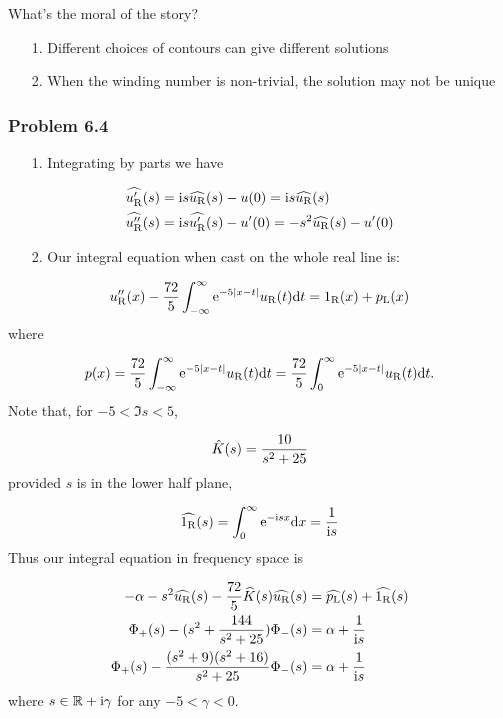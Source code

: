 \documentclass[12pt,landscape]{article}
\def\D{ {\rm d} }
\def\I{ {\rm i} }
\def\E{ {\rm e} }
\def\R{ {\mathbb R} }
\def\dx{\D x}
\def\dt{\D t}
\def\rR{ {\rm R} }
\def\rL{ {\rm L} }
\begin{document}
{What's the moral of the story?

\begin{itemize}
\item[1. ] Different choices of contours can give different solutions


\item[2. ] When the winding number is non-trivial, the solution may not be unique

\end{itemize}
\subsubsection{Problem 6.4}
\begin{itemize}
\item[1. ] Integrating by parts we have

\end{itemize}

\begin{align*}
\widehat{u_\rR'}(s) &= \I s \widehat{u_\rR}(s) - u(0) = \I s \widehat{u_\rR}(s) \\
\widehat{u_\rR''}(s) &= \I s \widehat{u_\rR'}(s) - u'(0)  = -s^2 \widehat{u_\rR}(s) - u'(0)
\end{align*}
\begin{itemize}
\item[2. ] Our integral equation when cast on the whole real line is:

\end{itemize}
\[
u_\rR''(x) - {72 \over 5} \int_{-\infty}^\infty \E^{-5 |x-t|} u_\rR(t)\dt = 1_\rR(x) + p_\rL(x)
\]
where

\[
p(x) = {72 \over 5} \int_{-\infty}^\infty \E^{-5 |x-t|} u_\rR(t)\dt =  {72 \over 5} \int_0^\infty \E^{-5 |x-t|} u_\rR(t)\dt.
\]
Note that, for $-5 <\Im s < 5$,

\[
\hat K(s) = {10 \over s^2 + 25}
\]
provided $s$ is in the lower half plane,

\[
\widehat{1_\rR}(s) = \int_0^\infty \E^{-\I s x} \dx = {1 \over \I s}
\]
Thus our integral equation in frequency space is


\begin{align*}
-\alpha - s^2 \widehat{u_\rR}(s) -  {72 \over 5} \widehat K(s) \widehat{u_\rR}(s) &=\widehat{p_\rL}(s) +  \widehat{1_\rR}(s)\\
\Phi_+(s) - (s^2 +   {144 \over s^2+25}) \Phi_-(s) &= \alpha + {1 \over \I s}\\
\Phi_+(s) -  {(s^2 + 9) (s^2+16) \over s^2+25} \Phi_-(s) &= \alpha + {1 \over \I s}
\end{align*}
where $s \in \R +\I \gamma$ for any $-5 < \gamma < 0$.

}
\end{document}
